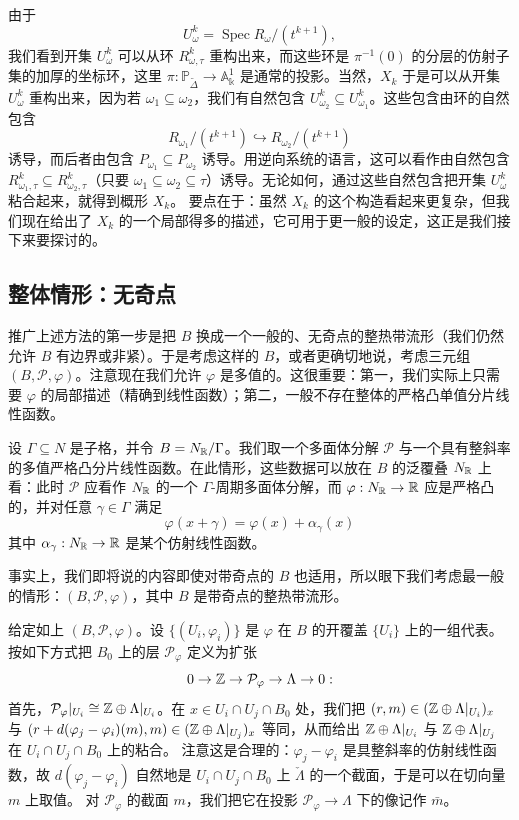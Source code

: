 由于
\[
U^k_\omega=\operatorname{Spec}R_\omega/(t^{k+1}),
\]
我们看到开集 $U^k_\omega$ 可以从环 $R^k_{\omega,\tau}$ 重构出来，而这些环是 $\pi^{-1}(0)$ 的分层的仿射子集的加厚的坐标环，这里 $\pi:\mathbb{P}_{\widetilde\Delta}\to\mathbb{A}^1_\Bbbk$ 是通常的投影。当然，$X_k$ 于是可以从开集 $U^k_\omega$ 重构出来，因为若 $\omega_1\subseteq\omega_2$，我们有自然包含 $U^k_{\omega_2}\subseteq U^k_{\omega_1}$。这些包含由环的自然包含
\[
R_{\omega_1}/(t^{k+1})\hookrightarrow R_{\omega_2}/(t^{k+1})
\]
诱导，而后者由包含 $P_{\omega_1}\subseteq P_{\omega_2}$ 诱导。用逆向系统的语言，这可以看作由自然包含 $R^k_{\omega_1,\tau}\subseteq R^k_{\omega_2,\tau}$（只要 $\omega_1\subseteq\omega_2\subseteq\tau$）诱导。无论如何，通过这些自然包含把开集 $U^k_\omega$ 粘合起来，就得到概形 $X_k$。
要点在于：虽然 $X_k$ 的这个构造看起来更复杂，但我们现在给出了 $X_k$ 的一个局部得多的描述，它可用于更一般的设定，这正是我们接下来要探讨的。

\subsection{整体情形：无奇点}
推广上述方法的第一步是把 $B$ 换成一个一般的、无奇点的整热带流形（我们仍然允许 $B$ 有边界或非紧）。于是考虑这样的 $B$，或者更确切地说，考虑三元组 $(B,\mathcal{P},\varphi)$。注意现在我们允许 $\varphi$ 是多值的。这很重要：第一，我们实际上只需要 $\varphi$ 的局部描述（精确到线性函数）；第二，一般不存在整体的严格凸单值分片线性函数。

\begin{example}
设 $\Gamma\subseteq N$ 是子格，并令 $B=N_{\mathbb{R}}/\Gamma$。我们取一个多面体分解 $\mathcal{P}$ 与一个具有整斜率的多值严格凸分片线性函数。在此情形，这些数据可以放在 $B$ 的泛覆叠 $N_{\mathbb{R}}$ 上看：此时 $\mathcal{P}$ 应看作 $N_{\mathbb{R}}$ 的一个 $\Gamma$-周期多面体分解，而 $\varphi:N_{\mathbb{R}}\to\mathbb{R}$ 应是严格凸的，并对任意 $\gamma\in\Gamma$ 满足
\[
\varphi(x+\gamma)=\varphi(x)+\alpha_\gamma(x)
\]
其中 $\alpha_\gamma:N_{\mathbb{R}}\to\mathbb{R}$ 是某个仿射线性函数。
\end{example}

事实上，我们即将说的内容即使对带奇点的 $B$ 也适用，所以眼下我们考虑最一般的情形：$(B,\mathcal{P},\varphi)$，其中 $B$ 是带奇点的整热带流形。

\begin{definition}
给定如上 $(B,\mathcal{P},\varphi)$。设 $\{(U_i,\varphi_i)\}$ 是 $\varphi$ 在 $B$ 的开覆盖 $\{U_i\}$ 上的一组代表。按如下方式把 $B_0$ 上的层 $\mathcal{P}_\varphi$ 定义为扩张
\[
0\to\mathbb{Z}\to\mathcal{P}_\varphi\to\Lambda\to0 :
\]
首先，$\mathcal{P}_\varphi|_{U_i}\cong\mathbb{Z}\oplus\Lambda|_{U_i}$。在 $x\in U_i\cap U_j\cap B_0$ 处，我们把 $(r,m)\in(\mathbb{Z}\oplus\Lambda|_{U_i})_x$ 与 $(r+d(\varphi_j-\varphi_i)(m),m)\in(\mathbb{Z}\oplus\Lambda|_{U_j})_x$ 等同，从而给出 $\mathbb{Z}\oplus\Lambda|_{U_i}$ 与 $\mathbb{Z}\oplus\Lambda|_{U_j}$ 在 $U_i\cap U_j\cap B_0$ 上的粘合。
注意这是合理的：$\varphi_j-\varphi_i$ 是具整斜率的仿射线性函数，故 $d(\varphi_j-\varphi_i)$ 自然地是 $U_i\cap U_j\cap B_0$ 上 $\check\Lambda$ 的一个截面，于是可以在切向量 $m$ 上取值。
对 $\mathcal{P}_\varphi$ 的截面 $m$，我们把它在投影 $\mathcal{P}_\varphi\to\Lambda$ 下的像记作 $\bar m$。
\end{definition}

